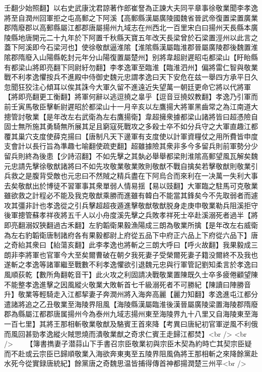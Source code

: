 壬翻少始照翻】以右史武康沈君諒著作郎崔詧為正諫大夫同平章事徐敬業聞李孝逸將至自潤州回軍拒之屯高郵之下阿溪【高郵縣漢屬廣陵國魏省晉武帝復置梁置廣業郡隋廢郡以高郵縣屬江都郡唐屬揚州九域志在州西北一百里宋白曰揚州天長縣本廣陵縣地唐開元二十九年於下阿置千秋縣天寶五年改天長梁曾於石梁置涇州以此言之蓋下阿溪即今石梁河也】使徐敬猷逼淮隂【淮隂縣漢屬臨淮郡晉屬廣陵郡後魏置淮隂郡隋廢入山陽縣乾封元年分山陽復置屬楚州】别將韋超尉遲昭屯都梁山【盱眙縣有都梁山將即亮翻下同尉紆勿翻】李孝逸軍至臨淮【臨淮泗州】偏將雷仁智與敬業戰不利孝逸懼按兵不進殿中侍御史魏元忠謂孝逸曰天下安危在兹一舉四方承平日久忽聞狂狡注心傾耳以俟其誅今大軍久留不進遠近失望萬一朝廷更命它將以代將軍【將即亮翻更工衡翻】將軍何辭以逃逗撓之辠乎【逗音豆撓奴教翻】孝逸乃引軍而前壬寅馬敬臣擊斬尉遲昭於都梁山十一月辛亥以左鷹揚大將軍黑齒常之為江南道大摠管討敬業【是年改左右武衛為左右鷹揚衛】韋超擁衆據都梁山諸將皆曰超憑險自固士無所施其勇騎無所展其足且窮寇死戰攻之多殺士卒不如分兵守之大軍直趣江都覆其巢穴支度使薛克揚曰【唐制凡天下邊軍有支度使以計軍資糧仗之用所費皆申度支會計以長行旨為準趣七喻翻使疏吏翻】超雖據險其衆非多今多留兵則前軍勢分少留兵則終為後患【少詩沼翻】不如先擊之其埶必舉舉都梁則淮隂高郵望風瓦解矣魏元忠請先擊徐敬猷諸將曰不如先攻敬業敬業敗則敬猷不戰自擒矣若擊敬猷則敬業引兵救之是腹背受敵也元忠曰不然賊之精兵盡在下阿烏合而來利在一决萬一失利大事去矣敬猷出於博徒不習軍事其衆單弱人情易揺【易以豉翻】大軍臨之駐馬可克敬業雖欲救之計程必不能及我克敬猷乘勝而進雖有韓白不能當其鋒矣今不先取弱者而遽攻其彊非計也孝逸從之引兵擊超超夜遁進擊敬猷敬猷脱身走庚申敬業勒兵阻溪拒守後軍摠管蘇孝祥夜將五千人以小舟度溪先擊之兵敗孝祥死士卒赴溪溺死者過半【將即亮翻溺奴狹翻過古禾翻】左豹韜衛果毅漁陽成三朗為敬業所擒【是年改左右威衛為左右豹韜衛唐制諸府各有果毅都尉上府從五品下中府正六品上下府從六品下】唐之奇紿其衆曰【紿蕩亥翻】此李孝逸也將斬之三朗大呼曰【呼火故翻】我果毅成三朗非李將軍也官軍今大至矣爾曹破在朝夕我死妻子受榮爾死妻子籍没爾終不及我也遂斬之孝逸等諸軍繼至戰數不利孝逸懼欲引退魏元忠與行軍管記劉知柔言於孝逸曰風順荻乾【數所角翻乾音干】此火攻之利固請决戰敬業置陳既久士卒多疲倦顧望陳不能整孝逸進擊之因風縱火敬業大敗斬首七千級溺死者不可勝紀【陳讀曰陣勝音升】敬業等輕騎走入江都挈妻子奔潤州將入海奔高麗【麗力知翻】孝逸進屯江都分遣諸將追之乙丑敬業至海陵界阻風【海陵縣漢屬臨淮後漢晉屬廣陵梁置海陵郡隋廢郡為縣屬江都郡唐属揚州今為泰州九域志揚州東至海陵界九十八里又自海陵東至海一百七里】其將王那相斬敬業敬猷及駱賓王首來降【考異曰唐紀初官軍逆風不利俄而風回甚勁孝逸縱火賊愳燒而潰敬業猷之奇求仁賓王走歸江都焚】<br />
<br />
　　【簿書擕妻子潜蒜山下手書召宗臣敬業初與宗臣木契為約時亡其契宗臣疑而不赴或云宗臣已歸順敬業入海欲奔東夷至五陵界阻風偽將王那相斬之來降餘黨赴水死今從實録唐統紀】餘黨唐之奇魏思温皆捕得傳首神都揚潤楚三州平<br />
